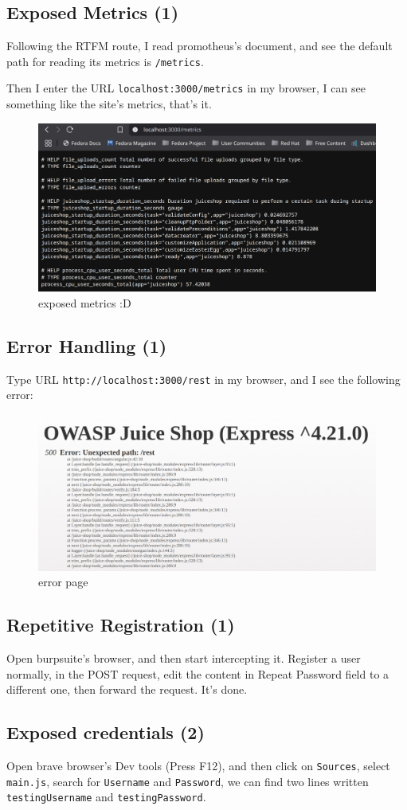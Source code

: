 \documentclass[12pt]{article}
\begin{document}
\subsection{Exposed Metrics (1)}
Following the RTFM route, I read promotheus's document, and see the default path for reading its metrics is \texttt{/metrics}.

Then I enter the URL \texttt{localhost:3000/metrics} in my browser, I can see something like the site's metrics, that's it.
\begin{figure}[H]
    \centering
    \includegraphics[width=0.6\linewidth]{images/3.png}
    \caption{exposed metrics :D}
\end{figure}
\subsection{Error Handling (1)}
Type URL \texttt{http://localhost:3000/rest} in my browser, and I see the following error:
\begin{figure}[H]
    \centering
    \includegraphics[width=0.6\linewidth]{images/4.png}
    \caption{error page}
\end{figure}
\subsection{Repetitive Registration (1)}
Open burpsuite's browser, and then start intercepting it. Register a user normally, in the POST request, edit the content in Repeat Password field to a different one, then forward the request. It's done.

\subsection{Exposed credentials (2)}
Open brave browser's Dev tools (Press F12), and then click on \texttt{Sources}, select \texttt{main.js}, search for \texttt{Username} and \texttt{Password}, we can find two lines written \texttt{testingUsername} and \texttt{testingPassword}. 
\end{document}

